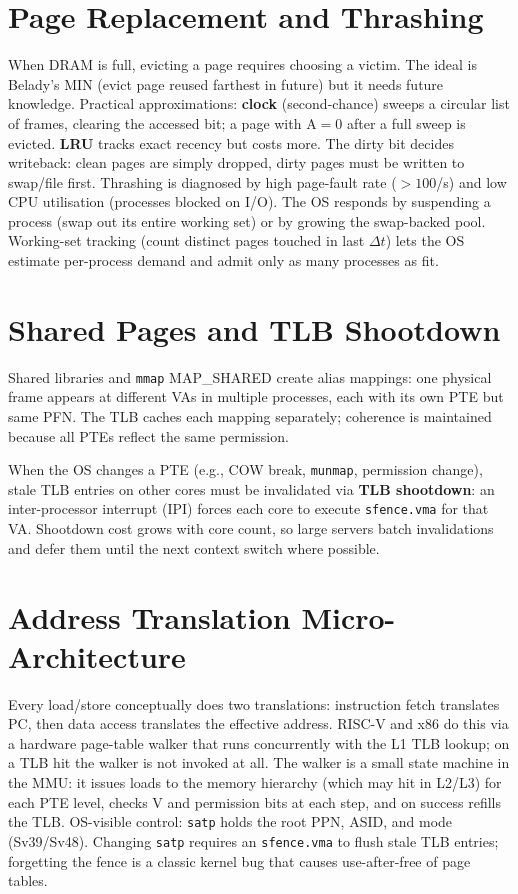 \section{Page Replacement and Thrashing}
When DRAM is full, evicting a page requires choosing a victim. The ideal is Belady's MIN (evict page reused farthest in future) but it needs future knowledge. Practical approximations: \textbf{clock} (second-chance) sweeps a circular list of frames, clearing the accessed bit; a page with A$=0$ after a full sweep is evicted. \textbf{LRU} tracks exact recency but costs more. The dirty bit decides writeback: clean pages are simply dropped, dirty pages must be written to swap/file first.
Thrashing is diagnosed by high page-fault rate ($>100$/s) and low CPU utilisation (processes blocked on I/O). The OS responds by suspending a process (swap out its entire working set) or by growing the swap-backed pool. Working-set tracking (count distinct pages touched in last $\Delta t$) lets the OS estimate per-process demand and admit only as many processes as fit.

\section{Shared Pages and TLB Shootdown}
Shared libraries and \texttt{mmap} MAP\_SHARED create alias mappings: one physical frame appears at different VAs in multiple processes, each with its own PTE but same PFN. The TLB caches each mapping separately; coherence is maintained because all PTEs reflect the same permission.

When the OS changes a PTE (e.g., COW break, \texttt{munmap}, permission change), stale TLB entries on other cores must be invalidated via \textbf{TLB shootdown}: an inter-processor interrupt (IPI) forces each core to execute \texttt{sfence.vma} for that VA. Shootdown cost grows with core count, so large servers batch invalidations and defer them until the next context switch where possible.

\section{Address Translation Micro-Architecture}
Every load/store conceptually does two translations: instruction fetch translates PC, then data access translates the effective address. RISC-V and x86 do this via a hardware page-table walker that runs concurrently with the L1 TLB lookup; on a TLB hit the walker is not invoked at all. The walker is a small state machine in the MMU: it issues loads to the memory hierarchy (which may hit in L2/L3) for each PTE level, checks V and permission bits at each step, and on success refills the TLB. OS-visible control: \texttt{satp} holds the root PPN, ASID, and mode (Sv39/Sv48). Changing \texttt{satp} requires an \texttt{sfence.vma} to flush stale TLB entries; forgetting the fence is a classic kernel bug that causes use-after-free of page tables.

